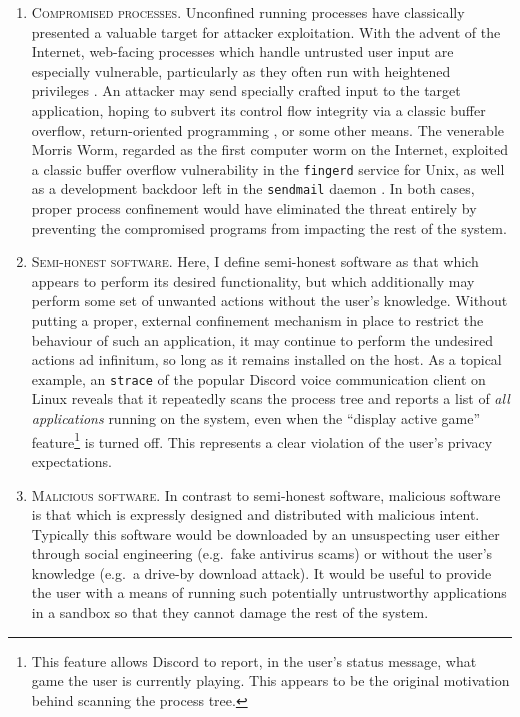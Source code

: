 \documentclass[dvipsnames, 12pt]{article}
\begin{document}
\begin{enumerate}[label=\bfseries A\arabic*., ref=A\arabic*, labelindent=2em]
    \item \label{a:1} \textsc{Compromised processes.} Unconfined running
    processes have classically presented a valuable target for attacker
    exploitation. With the advent of the Internet, web-facing processes which
    handle untrusted user input are especially vulnerable, particularly as they
    often run with heightened privileges \cite{cohen1996_secure}. An attacker
    may send specially crafted input to the target application, hoping to
    subvert its control flow integrity via a classic buffer overflow,
    return-oriented programming \cite{shacham2007_rop}, or some other means. The
    venerable Morris Worm, regarded as the first computer worm on the Internet,
    exploited a classic buffer overflow vulnerability in the \texttt{fingerd}
    service for Unix, as well as a development backdoor left in the
    \texttt{sendmail} daemon \cite{spafford1989_morris}. In both cases, proper
    process confinement would have eliminated the threat entirely by preventing
    the compromised programs from impacting the rest of the system.

    \item \label{a:2} \textsc{Semi-honest software.} Here, I define semi-honest
    software as that which appears to perform its desired functionality, but
    which additionally may perform some set of unwanted actions without the
    user's knowledge. Without putting a proper, external confinement mechanism
    in place to restrict the behaviour of such an application, it may continue
    to perform the undesired actions ad infinitum, so long as it remains
    installed on the host. As a topical example, an \texttt{strace} of the
    popular Discord \cite{discord} voice communication client on Linux reveals
    that it repeatedly scans the process tree and reports a list of \textit{all
    applications} running on the system, even when the \enquote{display active
    game} feature\footnote{This feature allows Discord to report, in the user's
    status message, what game the user is currently playing. This appears to be
    the original motivation behind scanning the process tree.} is turned off.
    This represents a clear violation of the user's privacy expectations.

    \item \label{a:3} \textsc{Malicious software.} In contrast to semi-honest
    software, malicious software is that which is expressly designed and
    distributed with malicious intent. Typically this software would be
    downloaded by an unsuspecting user either through social engineering
    (e.g.~fake antivirus scams) or without the user's knowledge (e.g.~a drive-by
    download attack). It would be useful to provide the user with a means of
    running such potentially untrustworthy applications in a sandbox so that
    they cannot damage the rest of the system.
\end{enumerate}
\end{document}
